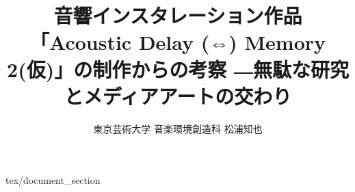 \documentclass[report,twocolumn]{jsbook}
\title {音響インスタレーション作品「Acoustic Delay (⇔) Memory 2(仮)」の制作からの考察 ―無駄な研究とメディアアートの交わり}
\author {東京芸術大学 音楽環境創造科 松浦知也}
\begin{document}
\maketitle

\tableofcontents

 {tex/document_section}



\end{document}
